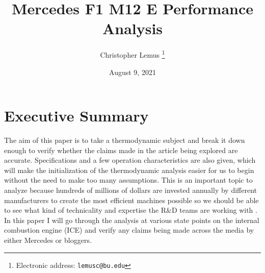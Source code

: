 \documentclass{article}
\title{\Huge Mercedes F1 M12 E Performance Analysis }
\begin{document}
\date{August 9, 2021}
\author{Christopher Lemus
  \thanks{Electronic address: \texttt{lemusc@bu.edu}}}
\maketitle

\newpage

\section{Executive Summary}
The aim of this paper is to take a thermodynamic subject and break it down enough to verify whether the claims made in the article being explored are accurate. Specifications and a few operation characteristics are also given, which will make the initialization of the thermodynamic analysis easier for us to begin without the need to make too many assumptions. This is an important topic to analyze because hundreds of millions of dollars are invested annually by different manufacturers to create the most efficient machines possible so we should be able to see what kind of technicality and expertise the R\&D teams are working with \cite{EngineDevCost}. In this paper I will go through the analysis at various state points on the internal combustion engine (ICE) and verify any claims being made across the media by either Mercedes or bloggers. 
\end{document}
